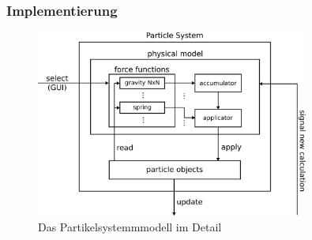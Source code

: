 \documentclass{beamer}
\begin{document}

\begin{frame}
\frametitle{Implementierung}
\begin{figure}[]
\centering
\includegraphics[width=0.8\textwidth]{../images/particle-system-detail.pdf}
\caption{Das Partikelsystemmmodell im Detail}
\label{fig:sysdiadetail}
\end{figure}
\end{frame}
\end{document}
